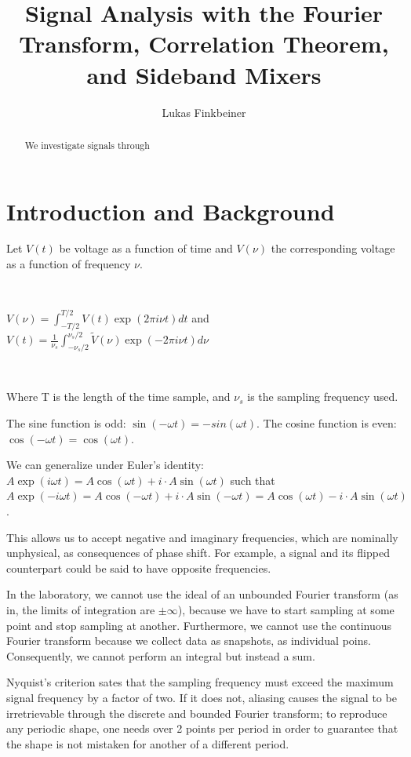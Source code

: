 \documentclass[a4paper]{article}
\title{Signal Analysis with the Fourier Transform, Correlation Theorem, and Sideband Mixers}
\author{Lukas Finkbeiner}
\begin{document}
\maketitle

\begin{abstract}

We investigate signals through

\end{abstract}


\section{Introduction and Background}

Let $V(t)$ be voltage as a function of time and $V(\nu)$ the corresponding voltage as a function of frequency $\nu$.

\

$V(\nu) = \int_{-T / 2}^{T / 2} V(t) \exp(2 \pi i \nu t) dt$ and $V(t) = \frac{1}{\nu_s} \int_{- \nu_s / 2}^{\nu_s / 2} \tilde{V}(\nu) \exp(-2 \pi i \nu t) d \nu$

\

Where T is the length of the time sample, and $\nu_s$ is the sampling frequency used.




The sine function is odd: $\sin(-\omega t) = -sin(\omega t)$. The cosine function is even: $\cos(-\omega t) = \cos (\omega t)$.

We can generalize under Euler's identity: $A\exp(i \omega t) = A \cos(\omega t) + i \cdot A \sin(\omega t)$ such that $A\exp(-i \omega t) = A \cos(-\omega t) + i \cdot A \sin(-\omega t) = A \cos(\omega t) - i \cdot A \sin(\omega t)$.

This allows us to accept negative and imaginary frequencies, which are nominally unphysical, as consequences of phase shift. For example, a signal and its flipped counterpart could be said to have opposite frequencies.

In the laboratory, we cannot use the ideal of an unbounded Fourier transform (as in, the limits of integration are $\pm \infty$), because we have to start sampling at some point and stop sampling at another. Furthermore, we cannot use the continuous Fourier transform because we collect data as snapshots, as individual poins. Consequently, we cannot perform an integral but instead a sum. 

Nyquist's criterion sates that the sampling frequency must exceed the maximum signal frequency by a factor of two. If it does not, aliasing causes the signal to be irretrievable through the discrete and bounded Fourier transform; to reproduce any periodic shape, one needs over 2 points per period in order to guarantee that the shape is not mistaken for another of a different period.
\end{document}
